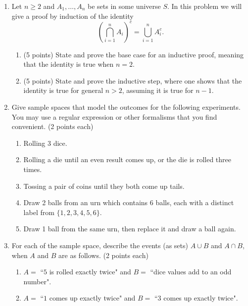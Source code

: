 \documentclass[11pt]{article}
\begin{document}
\begin{enumerate}


\item Let $n\geq 2$ and $A_1,\ldots,A_n$ be sets in some universe $S$.  In this
problem we will give a proof by induction of the identity
\[
\left(\bigcap_{i=1}^n A_i\right)^c = \bigcup_{i=1}^n A_i^c.
\]

\begin{enumerate}
\item (5 points)  State and prove the base case for an inductive proof, meaning
that the identity is true when $n=2$.

\item (5 points)  State and prove the inductive step, where one shows that the 
identity is true for general $n>2$, assuming it is true for $n-1$.
\end{enumerate}

\item Give sample spaces that model the outcomes for the following experiments.
You may use a regular expression or other formalisms that you find convenient.
(2 points each)
\begin{enumerate}

\item Rolling 3 dice.

\item Rolling a die until an even result comes up, or the die is rolled three
times.

\item Tossing a pair of coins until they both come up tails.  

\item Draw 2 balls from an urn which contains 6 balls, each with a
distinct label from $\{1,2,3,4,5,6\}$.

\item 
Draw 1 ball from the same urn, then replace it and draw a ball again.
\end{enumerate}


\item For each of the sample space, describe the events (as sets)
$A\cup B$ and $A \cap B$, when $A$ and $B$ are as follows.  (2 points each)
\begin{enumerate}

\item $A =$ ``$5$ is rolled exactly twice" and $B = $ ``dice values add to an
odd number".

\item $A =$ ``$1$ comes up exactly twice" and $B = $ ``$3$ comes up exactly
twice".


\end{enumerate}
\end{enumerate}
\end{document}
